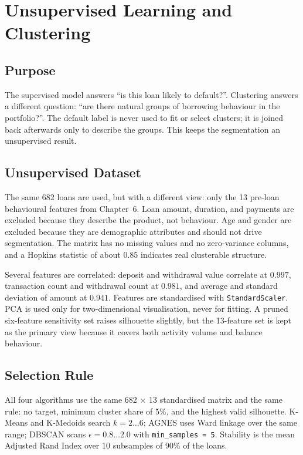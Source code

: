\chapter{Unsupervised Learning and Clustering}
\section{Purpose}
The supervised model answers ``is this loan likely to default?''. Clustering answers a different question: ``are there natural groups of borrowing behaviour in the portfolio?''. The default label is never used to fit or select clusters; it is joined back afterwards only to describe the groups. This keeps the segmentation an unsupervised result.

\section{Unsupervised Dataset}
The same 682 loans are used, but with a different view: only the 13 pre-loan behavioural features from Chapter~6. Loan amount, duration, and payments are excluded because they describe the product, not behaviour. Age and gender are excluded because they are demographic attributes and should not drive segmentation. The matrix has no missing values and no zero-variance columns, and a Hopkins statistic of about $0.85$ indicates real clusterable structure.

Several features are correlated: deposit and withdrawal value correlate at $0.997$, transaction count and withdrawal count at $0.981$, and average and standard deviation of amount at $0.941$. Features are standardised with \texttt{StandardScaler}. PCA is used only for two-dimensional visualisation, never for fitting. A pruned six-feature sensitivity set raises silhouette slightly, but the 13-feature set is kept as the primary view because it covers both activity volume and balance behaviour.

\section{Selection Rule}
All four algorithms use the same 682 $\times$ 13 standardised matrix and the same rule: no target, minimum cluster share of 5\%, and the highest valid silhouette. K-Means and K-Medoids search $k=2\ldots6$; AGNES uses Ward linkage over the same range; DBSCAN scans $\epsilon = 0.8\ldots2.0$ with \texttt{min\_samples = 5}. Stability is the mean Adjusted Rand Index over 10 subsamples of 90\% of the loans.

